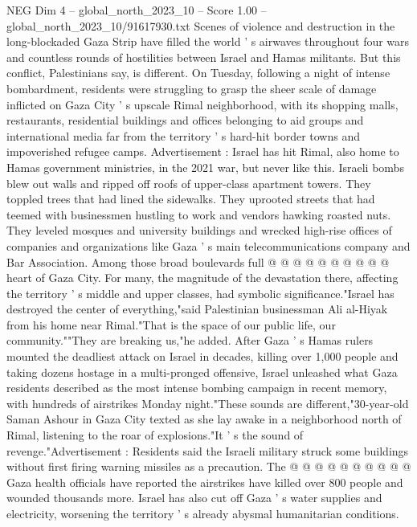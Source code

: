 \begin{textsample}{NEG Dim 4 – global\_north\_2023\_10 – Score 1.00 – global\_north\_2023\_10/91617930.txt}  \label{ex:f4_neg_007}
Scenes of violence and destruction in the long-blockaded Gaza Strip have filled the world ' s airwaves throughout four wars and countless rounds of hostilities between Israel and Hamas militants.
But this conflict, Palestinians say, is different.
On Tuesday, following a night of intense bombardment, residents were struggling to grasp the sheer scale of damage inflicted on Gaza City ' s upscale Rimal neighborhood, with its shopping malls, restaurants, residential buildings and offices belonging to aid groups and international media far from the territory ' s hard-hit border towns and impoverished refugee camps.
Advertisement : Israel has hit Rimal, also home to Hamas government ministries, in the 2021 war, but never like this.
Israeli bombs blew out walls and ripped off roofs of upper-class apartment towers.
They toppled trees that had lined the sidewalks.
They uprooted streets that had teemed with businessmen hustling to work and vendors hawking roasted nuts.
They leveled mosques and university buildings and wrecked high-rise offices of companies and organizations like Gaza ' s main telecommunications company and Bar Association.
Among those broad boulevards full @ @ @ @ @ @ @ @ @ @ heart of Gaza City.
For many, the magnitude of the devastation there, affecting the territory ' s middle and upper classes, had symbolic significance."Israel has destroyed the center of everything,"said Palestinian businessman Ali al-Hiyak from his home near Rimal."That is the space of our public life, our community.""They are breaking us,"he added.
After Gaza ' s Hamas rulers mounted the deadliest attack on Israel in decades, killing over 1,000 people and taking dozens hostage in a multi-pronged offensive, Israel unleashed what Gaza residents described as the most intense bombing campaign in recent memory, with hundreds of airstrikes Monday night."These sounds are different,"30-year-old Saman Ashour in Gaza City texted as she lay awake in a neighborhood north of Rimal, listening to the roar of explosions."It ' s the sound of revenge."Advertisement : Residents said the Israeli military struck some buildings without first firing warning missiles as a precaution.
The @ @ @ @ @ @ @ @ @ @ Gaza health officials have reported the airstrikes have killed over 800 people and wounded thousands more.
Israel has also cut off Gaza ' s water supplies and electricity, worsening the territory ' s already abysmal humanitarian conditions.

\end{textsample}
